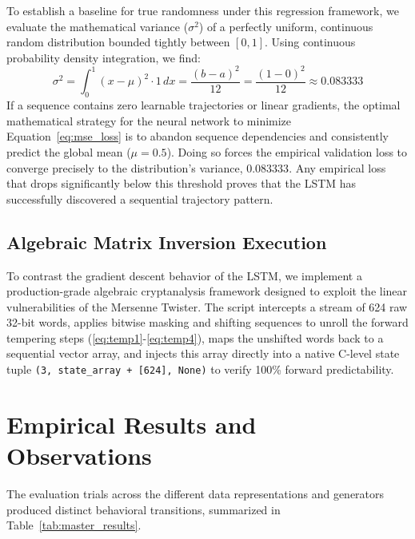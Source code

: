 \documentclass[twocolumn,10pt]{article}
\begin{document}
To establish a baseline for true randomness under this regression framework, we evaluate the mathematical variance ($\sigma^2$) of a perfectly uniform, continuous random distribution bounded tightly between $[0, 1]$. Using continuous probability density integration, we find:
\begin{equation}\label{eq:variance_proof}
\sigma^2 = \int_{0}^{1} (x - \mu)^2 \cdot 1 \, dx = \frac{(b-a)^2}{12} = \frac{(1-0)^2}{12} \approx 0.083333
\end{equation}
If a sequence contains zero learnable trajectories or linear gradients, the optimal mathematical strategy for the neural network to minimize Equation~\ref{eq:mse_loss} is to abandon sequence dependencies and consistently predict the global mean ($\mu = 0.5$). Doing so forces the empirical validation loss to converge precisely to the distribution's variance, $0.083333$. Any empirical loss that drops significantly below this threshold proves that the LSTM has successfully discovered a sequential trajectory pattern.

\subsection{Algebraic Matrix Inversion Execution}
To contrast the gradient descent behavior of the LSTM, we implement a production-grade algebraic cryptanalysis framework designed to exploit the linear vulnerabilities of the Mersenne Twister. The script intercepts a stream of 624 raw 32-bit words, applies bitwise masking and shifting sequences to unroll the forward tempering steps (\ref{eq:temp1}-\ref{eq:temp4}), maps the unshifted words back to a sequential vector array, and injects this array directly into a native C-level state tuple \texttt{(3, state\_array + [624], None)} to verify 100\% forward predictability.

\section{Empirical Results and Observations}
The evaluation trials across the different data representations and generators produced distinct behavioral transitions, summarized in Table~\ref{tab:master_results}.
\end{document}
